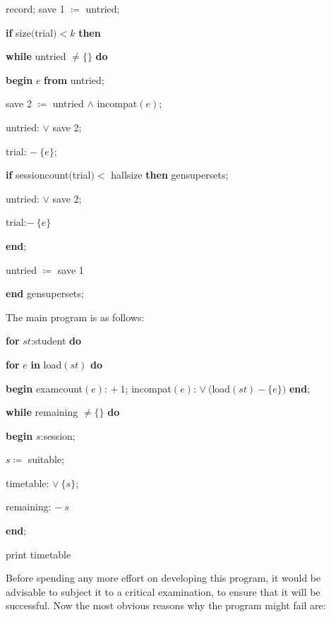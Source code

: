 \quad \quad \quad record; save 1 $\coloneq$ untried;

\quad \quad \quad \textbf{if} size$($trial$) < k$ \textbf{then}

\quad \quad \quad \quad \textbf{while} untried $\neq \{\}$ \textbf{do}

\quad \quad \quad \quad \quad \textbf{begin} $e$ \textbf{from} untried;

\quad \quad \quad \quad \quad \quad save 2 $\coloneq$ untried $\wedge$ incompat$(e)$;

\quad \quad \quad \quad \quad \quad untried: $\vee$ save 2;

\quad \quad \quad \quad \quad \quad trial: $-\ \{e\}$;

\quad \quad \quad \quad \quad \quad \textbf{if} sessioncount$($trial$) <$ hallsize \textbf{then} gensupersets;

\quad \quad \quad \quad \quad \quad untried: $\vee$ save 2;

\quad \quad \quad \quad \quad \quad trial:$-\ \{e\}$

\quad \quad \quad \quad \quad \textbf{end};

\quad \quad \quad \quad untried $\coloneq$ save 1

\quad \textbf{end} gensupersets;

\noindent
The main program is as follows:

\quad \textbf{for} $st$:student \textbf{do}

\quad \quad \textbf{for} $e$ \textbf{in} load$(st)$ \textbf{do}

\quad \quad \quad \textbf{begin} examcount$(e)$: $+\ 1$; incompat$(e)$: $\vee\ ($load$(st) - \{e\})$ \textbf{end};

\quad \textbf{while} remaining $\neq \{\}$ \textbf{do}

\quad \quad \quad \textbf{begin} $s$:session;

\quad \quad \quad \quad $s\coloneq$ suitable;

\quad \quad \quad \quad timetable: $\vee\ \{s\}$;

\quad \quad \quad \quad remaining: $-\ s$

\quad \quad \quad \textbf{end};

\quad print timetable

Before spending any more effort on developing this program, it would be advisable to subject it to a critical examination, to ensure that it will be successful. Now the most obvious reasons why the program might fail are:

